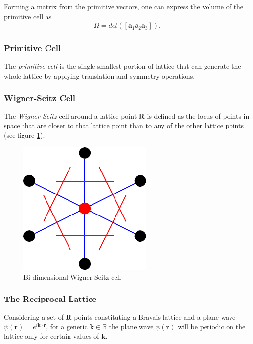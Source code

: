 \documentclass[a4paper,12pt]{article}
\newcommand\mf[1]{\mathbf{#1}}
\newcommand\erre{\mathbf{r}}
\begin{document}
Forming a matrix from the primitive vectors, one can express the volume of the primitive cell as 
\begin{align}
	\Omega = det(\left[\mf{a}_1 \mf{a}_2 \mf{a}_3\right]).
\end{align}

\subsubsection{Primitive Cell}
The \textit{primitive cell} is the single smallest portion of lattice that can generate the whole lattice by applying translation and symmetry operations.

\subsubsection{Wigner-Seitz Cell}

The \textit{Wigner-Seitz} cell around a lattice point $\mathbf{R}$ is defined as the locus of points in space that are closer to that lattice point than to any of the other lattice points (see figure \ref{fig:WSCell}).

\begin{figure}[h]
\begin{center}
	\includegraphics[width=0.4\linewidth]{Wigner.pdf}
	\caption{Bi-dimensional Wigner-Seitz cell}
	\label{fig:WSCell}
\end{center}
\end{figure}

\subsubsection{The Reciprocal Lattice}
Considering a set of $\mathbf{R}$ points constituting a Bravais lattice and a plane wave $\psi(\erre) = e^{i\mathbf{k}\cdot\mathbf{r}}$, for a generic $\mathbf{k} \in \mathbb{R}$ the plane wave $\psi(\erre)$ will be periodic on the lattice only for certain values of $\mathbf{k}$.
\end{document}
